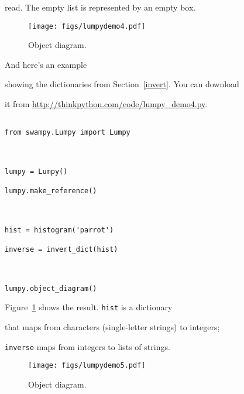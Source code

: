 read.  The empty list is represented by an empty box. 




\begin{figure}

\centerline

{\texttt{[image: figs/lumpydemo4.pdf]}}

\caption{Object diagram.}

\label{fig.lumpy4}

\end{figure}



And here's an example 

showing the dictionaries from Section~\ref{invert}.  You can download

it from \url{http://thinkpython.com/code/lumpy_demo4.py}.




\begin{verbatim}

from swampy.Lumpy import Lumpy



lumpy = Lumpy()

lumpy.make_reference()



hist = histogram('parrot')

inverse = invert_dict(hist)



lumpy.object_diagram()

\end{verbatim}



Figure~\ref{fig.lumpy4} shows the result.  {\tt hist} is a dictionary

that maps from characters (single-letter strings) to integers;

{\tt inverse} maps from integers to lists of strings.



\begin{figure}

\centerline

{\texttt{[image: figs/lumpydemo5.pdf]}}

\caption{Object diagram.}

\label{fig.lumpy5}

\end{figure}



